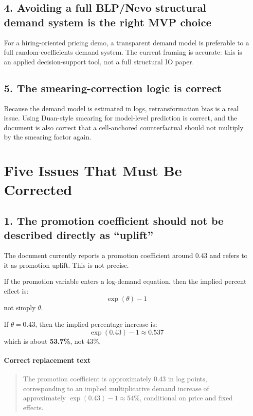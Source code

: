 \documentclass[11pt]{article}
\begin{document}
\subsection*{4. Avoiding a full BLP/Nevo structural demand system is the right MVP choice}
For a hiring-oriented pricing demo, a transparent demand model is preferable to a full random-coefficients demand system. The current framing is accurate: this is an applied decision-support tool, not a full structural IO paper.

\subsection*{5. The smearing-correction logic is correct}
Because the demand model is estimated in logs, retransformation bias is a real issue. Using Duan-style smearing for model-level prediction is correct, and the document is also correct that a cell-anchored counterfactual should not multiply by the smearing factor again.

\section*{Five Issues That Must Be Corrected}

\subsection*{1. The promotion coefficient should not be described directly as ``uplift''}
The document currently reports a promotion coefficient around 0.43 and refers to it as promotion uplift. This is not precise.

If the promotion variable enters a log-demand equation, then the implied percent effect is:
\[
\exp(\theta) - 1
\]
not simply $\theta$.

If $\theta = 0.43$, then the implied percentage increase is:
\[
\exp(0.43)-1 \approx 0.537
\]
which is about \textbf{53.7\%}, not 43\%.

\paragraph{Correct replacement text}
\begin{quote}
The promotion coefficient is approximately 0.43 in log points, corresponding to an implied multiplicative demand increase of approximately $\exp(0.43)-1 \approx 54\%$, conditional on price and fixed effects.
\end{quote}
\end{document}

